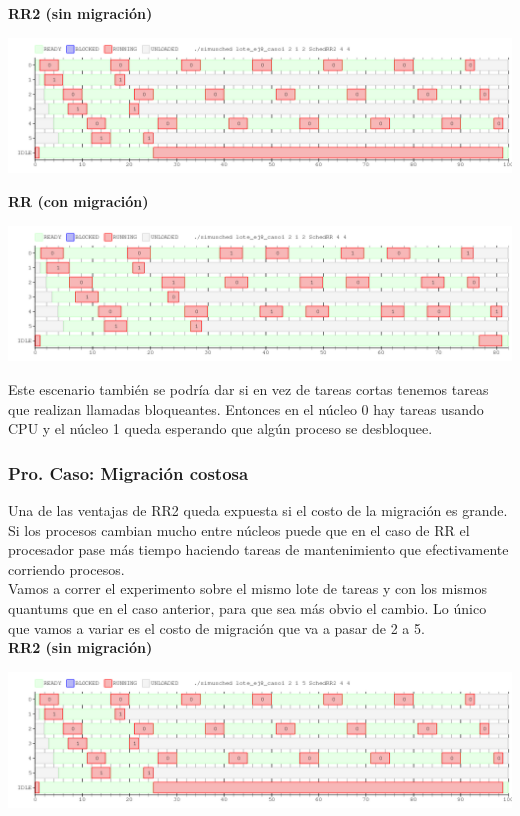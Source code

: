 \textbf{RR2 (sin migración)}
\begin{center}
 \includegraphics[scale=0.48]{./RR2/caso1RR2.png}
\end{center}

\textbf{RR (con migración)}
\begin{center}
 \includegraphics[scale=0.48]{./RR2/caso1RR.png}
\end{center}

Este escenario también se podría dar si en vez de tareas cortas tenemos tareas que realizan llamadas bloqueantes.
Entonces en el núcleo 0 hay tareas usando CPU y el núcleo 1 queda esperando que algún proceso se desbloquee.\\

\subsubsection{Pro. Caso: Migración costosa}
Una de las ventajas de RR2 queda expuesta si el costo de la migración es grande.
Si los procesos cambian mucho entre núcleos puede que en el caso de RR 
el procesador pase más tiempo haciendo tareas de mantenimiento que efectivamente corriendo procesos.\\

Vamos a correr el experimento sobre el mismo lote de tareas y con los mismos
quantums que en el caso anterior, para que sea más obvio el cambio. Lo único
que vamos a variar es el costo de migración que va a pasar de 2 a 5.\\

\textbf{RR2 (sin migración)}
\begin{center}
 \includegraphics[scale=0.48]{./RR2/caso2RR2.png}
\end{center}


